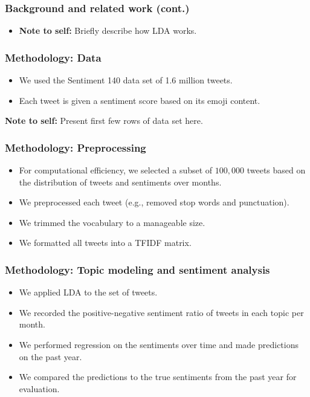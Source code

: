 \documentclass{beamer}
\begin{document}
\begin{frame}
\frametitle{Background and related work (cont.)}
\begin{itemize}
\item \textbf{Note to self: } Briefly describe how LDA works.
\end{itemize}
\end{frame}

\begin{frame}
\frametitle{Methodology: Data}
\begin{itemize}
\item We used the Sentiment 140 data set of 1.6 million tweets.
\item Each tweet is given a sentiment score based on its emoji content.
\end{itemize}
\begin{center}
\textbf{Note to self: } Present first few rows of data set here.
\end{center}
\end{frame}

\begin{frame}
\frametitle{Methodology: Preprocessing}
\begin{itemize}
\item For computational efficiency, we selected a subset of $100,000$ tweets based on the distribution of tweets and sentiments over months.
\item We preprocessed each tweet (e.g., removed stop words and punctuation).
\item We trimmed the vocabulary to a manageable size.
\item We formatted all tweets into a TFIDF matrix.
\end{itemize}
\end{frame}

\begin{frame}
\frametitle{Methodology: Topic modeling and sentiment analysis}
\begin{itemize}
\item We applied LDA to the set of tweets.
\item We recorded the positive-negative sentiment ratio of tweets in each topic per month.
\item We performed regression on the sentiments over time and made predictions on the past year.
\item We compared the predictions to the true sentiments from the past year for evaluation.
\end{itemize}
\end{frame}
\end{document}
